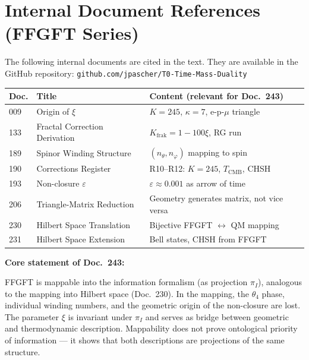 \section*{Internal Document References (FFGFT Series)}

The following internal documents are cited in the text. They are available
in the GitHub repository:
\texttt{github.com/jpascher/T0-Time-Mass-Duality}

\begin{center}
\renewcommand{\arraystretch}{1.3}
{\small
\begin{tabular}{p{1.2cm}p{6cm}p{6cm}}
\toprule
\textbf{Doc.} & \textbf{Title} & \textbf{Content (relevant for Doc.~243)} \\
\midrule
009 & Origin of $\xi$ & $K=245$, $\kappa=7$, e-p-$\mu$ triangle \\
133 & Fractal Correction Derivation & $K_\text{frak} = 1 - 100\xi$, RG run \\
189 & Spinor Winding Structure & $(n_\theta, n_\varphi)$ mapping to spin \\
190 & Corrections Register & R10--R12: $K=245$, $T_\text{CMB}$, CHSH \\
193 & Non-closure $\varepsilon$ & $\varepsilon \approx 0.001$ as arrow of time \\
206 & Triangle-Matrix Reduction & Geometry generates matrix, not vice versa \\
230 & Hilbert Space Translation & Bijective FFGFT $\leftrightarrow$ QM mapping \\
231 & Hilbert Space Extension & Bell states, CHSH from FFGFT \\
\bottomrule
\end{tabular}
}
\end{center}

\begin{keyresult}
  \textbf{Core statement of Doc.~243:}

  FFGFT is mappable into the information formalism (as projection
  $\pi_I$), analogous to the mapping into Hilbert space (Doc.~230).
  In the mapping, the $\theta_4$ phase, individual winding numbers,
  and the geometric origin of the non-closure are lost. The parameter
  $\xi$ is invariant under $\pi_I$ and serves as bridge between
  geometric and thermodynamic description. Mappability does not prove
  ontological priority of information --- it shows that both descriptions
  are projections of the same structure.
\end{keyresult}
